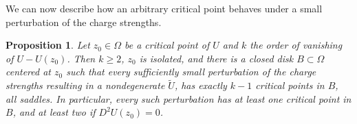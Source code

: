 \documentclass[leqno,11pt]{amsart}
\numberwithin{equation}{section}
\newtheorem{proposition}{Proposition}
\theoremstyle{definition}
\begin{document}
	We can now describe how an arbitrary critical point behaves under a small perturbation of the charge strengths.
	
	\begin{proposition}\label{prop:local-perturbation}
		Let $z_0\in\Omega$ be a critical point of $U$ and $k$ the order of vanishing of $U-U(z_0)$. %
		Then $k\geq2$, $z_0$ is isolated, and there is a closed disk $B\subset\Omega$ centered at $z_0$ such that every sufficiently small perturbation of the charge strengths resulting in a nondegenerate $\widetilde U$, has exactly $k-1$ critical points in $B$, all saddles. In particular, every such perturbation has at least one critical point in $B$, and at least two if $D^2U(z_0)=0$.
	\end{proposition}
	
\end{document}
